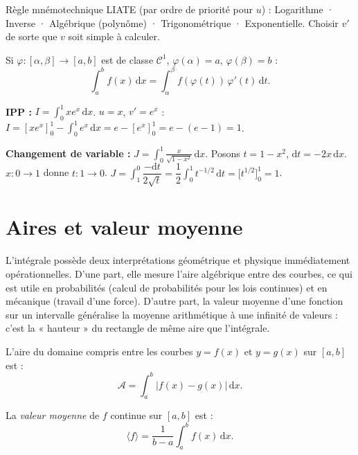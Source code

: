 \documentclass[11pt,a4paper,twoside]{book}
\begin{document}
\begin{methodebox}
Règle mnémotechnique LIATE (par ordre de priorité pour $u$) :
Logarithme · Inverse · Algébrique (polynôme) · Trigonométrique · Exponentielle.
Choisir $v'$ de sorte que $v$ soit simple à calculer.
\end{methodebox}

\begin{theoremebox}
Si $\varphi : [\alpha,\beta] \to [a,b]$ est de classe $\mathcal{C}^1$, $\varphi(\alpha)=a$, $\varphi(\beta)=b$ :
\[
  \int_a^b f(x)\,\mathrm{d}x = \int_\alpha^\beta f(\varphi(t))\,\varphi'(t)\,\mathrm{d}t.
\]
\end{theoremebox}

\begin{exemplebox}
\textbf{IPP :} $\displaystyle I = \int_0^1 x e^x\,\mathrm{d}x$.
$u=x$, $v'=e^x$ : $I = [xe^x]_0^1 - \int_0^1 e^x\,\mathrm{d}x = e - [e^x]_0^1 = e-(e-1) = 1$.

\textbf{Changement de variable :} $\displaystyle J = \int_0^1 \frac{x}{\sqrt{1-x^2}}\,\mathrm{d}x$.
Posons $t = 1-x^2$, $\mathrm{d}t = -2x\,\mathrm{d}x$. $x:0\to1$ donne $t:1\to0$.
$J = \int_1^0 \dfrac{-\mathrm{d}t}{2\sqrt{t}} = \dfrac{1}{2}\int_0^1 t^{-1/2}\,\mathrm{d}t = \big[t^{1/2}\big]_0^1 = 1$.
\end{exemplebox}

\section{Aires et valeur moyenne}

L'intégrale possède deux interprétations géométrique et physique immédiatement opérationnelles. D'une part, elle mesure l'aire algébrique entre des courbes, ce qui est utile en probabilités (calcul de probabilités pour les lois continues) et en mécanique (travail d'une force). D'autre part, la valeur moyenne d'une fonction sur un intervalle généralise la moyenne arithmétique à une infinité de valeurs : c'est la « hauteur » du rectangle de même aire que l'intégrale.

\begin{definitionbox}
L'aire du domaine compris entre les courbes $y=f(x)$ et $y=g(x)$ sur $[a,b]$ est :
\[
  \mathcal{A} = \int_a^b |f(x)-g(x)|\,\mathrm{d}x.
\]
\end{definitionbox}

\begin{definitionbox}
La \emph{valeur moyenne} de $f$ continue sur $[a,b]$ est :
\[
  \langle f \rangle = \frac{1}{b-a}\int_a^b f(x)\,\mathrm{d}x.
\]
\end{definitionbox}
\end{document}
